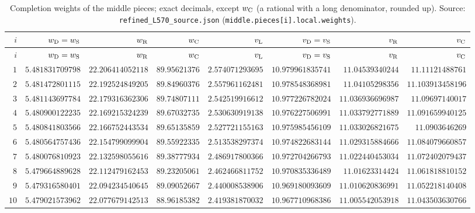 {\scriptsize\setlength{\tabcolsep}{3pt}\renewcommand{\arraystretch}{0.92}
\begin{longtable}{@{}rrrrrrrr@{}}
\caption{Completion weights of the middle pieces; exact decimals, except $w_{\rm C}$ (a rational with a long denominator, rounded up). Source: \texttt{refined\_L570\_source.json} (\texttt{middle.pieces[i].local.weights}).}\label{tab:data:middle-weights}\\
\toprule
$i$ & $w_{\rm D}=w_{\rm S}$ & $w_{\rm R}$ & $w_{\rm C}$ & $v_{\rm L}$ & $v_{\rm D}=v_{\rm S}$ & $v_{\rm R}$ & $v_{\rm C}$\\
\midrule
\endfirsthead
\toprule
$i$ & $w_{\rm D}=w_{\rm S}$ & $w_{\rm R}$ & $w_{\rm C}$ & $v_{\rm L}$ & $v_{\rm D}=v_{\rm S}$ & $v_{\rm R}$ & $v_{\rm C}$\\
\midrule
\endhead
\bottomrule
\endfoot
$1$ & $5.481831709798$ & $22.206414052118$ & $89.95621376$ & $2.574071293695$ & $10.979961835741$ & $11.04539340244$ & $11.11121488761$\\
$2$ & $5.481472801115$ & $22.192524849205$ & $89.84960376$ & $2.557961162481$ & $10.978548368981$ & $11.04105298356$ & $11.103913458196$\\
$3$ & $5.481143697784$ & $22.179316362306$ & $89.74807111$ & $2.542519916612$ & $10.977226782024$ & $11.036936696987$ & $11.09697140017$\\
$4$ & $5.480900122235$ & $22.169215324239$ & $89.67032735$ & $2.530630919138$ & $10.976227506991$ & $11.033792771889$ & $11.091659940125$\\
$5$ & $5.480841803566$ & $22.166752443534$ & $89.65135859$ & $2.527721155163$ & $10.975985456109$ & $11.033026821675$ & $11.0903646269$\\
$6$ & $5.480564757436$ & $22.154799099904$ & $89.55922335$ & $2.513538297374$ & $10.974822683144$ & $11.029315884666$ & $11.084079660857$\\
$7$ & $5.480076810923$ & $22.132598055616$ & $89.38777934$ & $2.486917800366$ & $10.972704266793$ & $11.022440453034$ & $11.072402079437$\\
$8$ & $5.479664889628$ & $22.112479162453$ & $89.23205061$ & $2.462466811752$ & $10.970835336489$ & $11.01623314424$ & $11.061818810152$\\
$9$ & $5.479316580401$ & $22.094234540645$ & $89.09052667$ & $2.440008538906$ & $10.969180093609$ & $11.010620836991$ & $11.052218140408$\\
$10$ & $5.479021573962$ & $22.077679142513$ & $88.96185382$ & $2.419381870032$ & $10.967710968386$ & $11.005542053918$ & $11.043503630766$\\

\end{longtable}}
